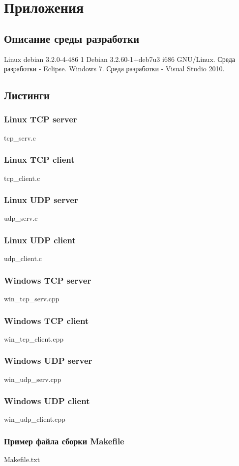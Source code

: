 \documentclass[12pt,a4paper]{report}
\begin{document}
\chapter*{Приложения}
\section*{Описание среды разработки}
Linux debian 3.2.0-4-486 1 Debian 3.2.60-1+deb7u3 i686 GNU/Linux. Среда разработки - Eclipse.
Windows 7. Среда разработки - Visual Studio 2010.

\section*{Листинги}
\subsection*{Linux TCP server}

{tcp_serv.c}
\subsection*{Linux TCP client}

{tcp_client.c}
\subsection*{Linux UDP server}

{udp_serv.c}
\subsection*{Linux UDP client}

{udp_client.c}
\subsection*{Windows TCP server}

{win_tcp_serv.cpp}
\subsection*{Windows TCP client}

{win_tcp_client.cpp}
\subsection*{Windows UDP server}

{win_udp_serv.cpp}
\subsection*{Windows UDP client}

{win_udp_client.cpp}
\subsection*{Пример файла сборки Makefile}

{Makefile.txt}
\end{document}
